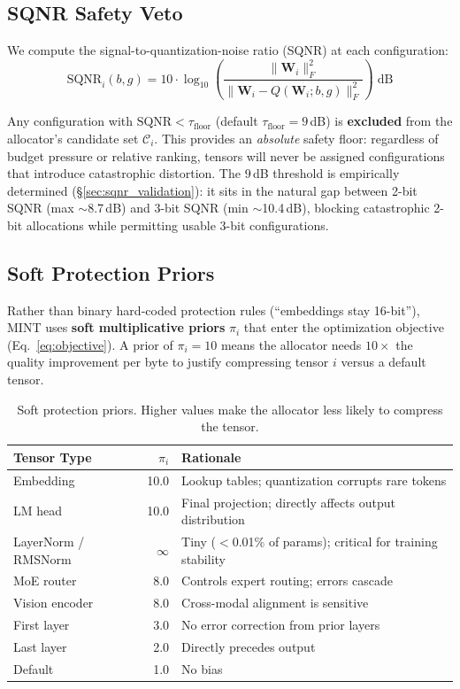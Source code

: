 \documentclass{article}
\begin{document}
\subsection{SQNR Safety Veto}

We compute the signal-to-quantization-noise ratio (SQNR) at each configuration:
\begin{equation}
    \text{SQNR}_i(b, g) = 10 \cdot \log_{10}\!\left(\frac{\|\mathbf{W}_i\|_F^2}{\|\mathbf{W}_i - Q(\mathbf{W}_i; b, g)\|_F^2}\right) \;\text{dB}
\end{equation}

Any configuration with $\text{SQNR} < \tau_{\text{floor}}$ (default $\tau_{\text{floor}} = 9$\,dB) is \textbf{excluded} from the allocator's candidate set $\mathcal{C}_i$. This provides an \emph{absolute} safety floor: regardless of budget pressure or relative ranking, tensors will never be assigned configurations that introduce catastrophic distortion. The 9\,dB threshold is empirically determined (\S\ref{sec:sqnr_validation}): it sits in the natural gap between 2-bit SQNR (max ${\sim}$8.7\,dB) and 3-bit SQNR (min ${\sim}$10.4\,dB), blocking catastrophic 2-bit allocations while permitting usable 3-bit configurations.

\subsection{Soft Protection Priors}
\label{sec:priors}

Rather than binary hard-coded protection rules (``embeddings stay 16-bit''), MINT uses \textbf{soft multiplicative priors} $\pi_i$ that enter the optimization objective (Eq.~\ref{eq:objective}). A prior of $\pi_i = 10$ means the allocator needs $10\times$ the quality improvement per byte to justify compressing tensor $i$ versus a default tensor.

\begin{table}[h]
\centering
\caption{Soft protection priors. Higher values make the allocator less likely to compress the tensor.}
\label{tab:priors}
\begin{tabular}{lrl}
\toprule
Tensor Type & $\pi_i$ & Rationale \\
\midrule
Embedding & 10.0 & Lookup tables; quantization corrupts rare tokens \\
LM head & 10.0 & Final projection; directly affects output distribution \\
LayerNorm / RMSNorm & $\infty$ & Tiny ($<$0.01\% of params); critical for training stability \\
MoE router & 8.0 & Controls expert routing; errors cascade \\
Vision encoder & 8.0 & Cross-modal alignment is sensitive \\
First layer & 3.0 & No error correction from prior layers \\
Last layer & 2.0 & Directly precedes output \\
Default & 1.0 & No bias \\
\bottomrule
\end{tabular}
\end{table}
\end{document}
